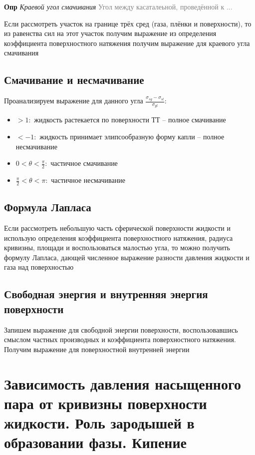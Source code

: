 \documentclass[a4paper, 14pt]{article}
\begin{document}
    \textbf{Опр} \textit{Краевой угол смачивания} \textcolor{gray}{Угол между касаталеьной, проведённой к ...}

    Если рассмотреть участок на границе трёх сред (газа, плёнки и поверхности), то из равенства сил на этот участок
    получим выражение из определения коэффициента поверхностного натяжения получим выражение для краевого угла
    смачивания

    \subsection{Смачивание и несмачивание}

    Проанализируем выражение для данного угла $\frac{\sigma_{sg} - \sigma_{sl}}{\sigma_{gl}}$:
    \begin{itemize}
        \item $> 1:$ жидкость растекается по поверхности ТТ -- полное смачивание
        \item $<-1:$ жидкость принимает элипсообразную форму капли -- полное несмачивание
        \item $0 < \theta < \frac{\pi}{2}:$ частичное смачивание
        \item $\frac{\pi}{2} < \theta < \pi:$ частичное несмачивание
    \end{itemize}

    \subsection{Формула Лапласа}

    Если рассмотреть небольшую часть сферической поверхности жидкости и использую определения коэффициента
    поверхностного натяжения, радиуса кривизны, площади и воспользоваться малостью угла, то можно получить формулу
    Лапласа, дающей численное выражение разности давления жидкости и газа над поверхностью

    \subsection{Свободная энергия и внутренняя энергия поверхности}

    Запишем выражение для свободной энергии поверхности, воспользовавшись смыслом частных производных и коэффициента
    поверхностного натяжения.
    Получим выражение для поверхностной внутренней энергии

    \section{Зависимость давления насыщенного пара от кривизны поверхности жидкости.
    Роль зародышей в образовании фазы.
    Кипение}
\end{document}
